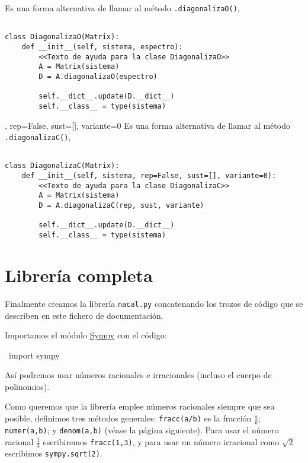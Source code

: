 \documentclass[11pt]{report}
\begin{document}
Es una forma alternativa de llamar al método \texttt{.diagonalizaO()},
\begin{verbatim}

class DiagonalizaO(Matrix):
    def __init__(self, sistema, espectro):
        <<Texto de ayuda para la clase DiagonalizaO>>
        A = Matrix(sistema)
        D = A.diagonalizaO(espectro)
            
        self.__dict__.update(D.__dict__)
        self.__class__ = type(sistema)

\end{verbatim}


, rep=False, sust=[], variante=0
Es una forma alternativa de llamar al método \texttt{.diagonalizaC()},
\begin{verbatim}

class DiagonalizaC(Matrix):
    def __init__(self, sistema, rep=False, sust=[], variante=0):
        <<Texto de ayuda para la clase DiagonalizaC>>
        A = Matrix(sistema)
        D = A.diagonalizaC(rep, sust, variante)
            
        self.__dict__.update(D.__dict__)
        self.__class__ = type(sistema)

\end{verbatim}


\part{Librería completa}
\label{sec:orgae23ff6}

Finalmente creamos la librería \texttt{nacal.py} concatenando los trozos de
código que se describen en este fichero de documentación.

Importamos el módulo \href{https://www.sympy.org/en/index.html}{Sympy} con el código:
\begin{center}
~import sympy~
\end{center}
Así podremos usar números racionales e irracionales (incluso el cuerpo
de polinomios). 

Como queremos que la librería emplee números racionales siempre que
sea posible, definimos tres métodos generales: \texttt{fracc(a/b)} es la
fracción \(\frac{a}{b}\); \texttt{numer(a,b)}; y \texttt{denom(a,b)} (véase la página
siguiente). Para usar el número racional \(\frac{1}{3}\) escribiremos
\texttt{fracc(1,3)}, y para usar un número irracional como \(\sqrt{2}\)
escribimos \texttt{sympy.sqrt(2)}. 
\end{document}
